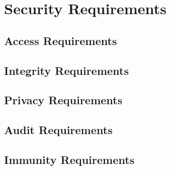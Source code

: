 \chapter{Security Requirements}

\section{Access Requirements}

\section{Integrity Requirements}

\section{Privacy Requirements}

\section{Audit Requirements}

\section{Immunity Requirements}
